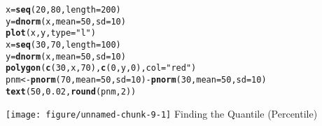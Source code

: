 \documentclass{article}\usepackage[]{graphicx}\usepackage[]{xcolor}
\makeatletter
\def\maxwidth{ %
  \ifdim\Gin@nat@width>\linewidth
    \linewidth
  \else
    \Gin@nat@width
  \fi
}
\newcommand{\hlnum}[1]{\textcolor[rgb]{0.686,0.059,0.569}{#1}}%
\newcommand{\hlsng}[1]{\textcolor[rgb]{0.192,0.494,0.8}{#1}}%
\newcommand{\hlopt}[1]{\textcolor[rgb]{0,0,0}{#1}}%
\newcommand{\hldef}[1]{\textcolor[rgb]{0.345,0.345,0.345}{#1}}%
\newcommand{\hlkwb}[1]{\textcolor[rgb]{0.69,0.353,0.396}{#1}}%
\newcommand{\hlkwc}[1]{\textcolor[rgb]{0.333,0.667,0.333}{#1}}%
\newcommand{\hlkwd}[1]{\textcolor[rgb]{0.737,0.353,0.396}{\textbf{#1}}}%
\newenvironment{kframe}{%
 \def\at@end@of@kframe{}%
 \ifinner\ifhmode%
  \def\at@end@of@kframe{\end{minipage}}%
  \begin{minipage}{\columnwidth}%
 \fi\fi%
 \def\FrameCommand##1{\hskip\@totalleftmargin \hskip-\fboxsep
 \colorbox{shadecolor}{##1}\hskip-\fboxsep
     \hskip-\linewidth \hskip-\@totalleftmargin \hskip\columnwidth}%
 \MakeFramed {\advance\hsize-\width
   \@totalleftmargin\z@ \linewidth\hsize
   \@setminipage}}%
 {\par\unskip\endMakeFramed%
 \at@end@of@kframe}
\newenvironment{knitrout}{}{} %
\makeatother
\begin{document}
\begin{knitrout}
\color{fgcolor}\begin{kframe}
\begin{alltt}
\hldef{x}\hlkwb{=}\hlkwd{seq}\hldef{(}\hlnum{20}\hldef{,}\hlnum{80}\hldef{,}\hlkwc{length}\hldef{=}\hlnum{200}\hldef{)}
\hldef{y}\hlkwb{=}\hlkwd{dnorm}\hldef{(x,}\hlkwc{mean}\hldef{=}\hlnum{50}\hldef{,}\hlkwc{sd}\hldef{=}\hlnum{10}\hldef{)}
\hlkwd{plot}\hldef{(x,y,}\hlkwc{type}\hldef{=}\hlsng{"l"}\hldef{)}
\hldef{x}\hlkwb{=}\hlkwd{seq}\hldef{(}\hlnum{30}\hldef{,}\hlnum{70}\hldef{,}\hlkwc{length}\hldef{=}\hlnum{100}\hldef{)}
\hldef{y}\hlkwb{=}\hlkwd{dnorm}\hldef{(x,}\hlkwc{mean}\hldef{=}\hlnum{50}\hldef{,}\hlkwc{sd}\hldef{=}\hlnum{10}\hldef{)}
\hlkwd{polygon}\hldef{(}\hlkwd{c}\hldef{(}\hlnum{30}\hldef{,x,}\hlnum{70}\hldef{),}\hlkwd{c}\hldef{(}\hlnum{0}\hldef{,y,}\hlnum{0}\hldef{),}\hlkwc{col}\hldef{=}\hlsng{"red"}\hldef{)}
\hldef{pnm} \hlkwb{<-} \hlkwd{pnorm}\hldef{(}\hlnum{70}\hldef{,}\hlkwc{mean}\hldef{=}\hlnum{50}\hldef{,}\hlkwc{sd}\hldef{=}\hlnum{10}\hldef{)}\hlopt{-}\hlkwd{pnorm}\hldef{(}\hlnum{30}\hldef{,}\hlkwc{mean}\hldef{=}\hlnum{50}\hldef{,}\hlkwc{sd}\hldef{=}\hlnum{10}\hldef{)}
\hlkwd{text}\hldef{(}\hlnum{50}\hldef{,} \hlnum{0.02}\hldef{,}\hlkwd{round}\hldef{(pnm,} \hlnum{2}\hldef{))}
\end{alltt}
\end{kframe}
\texttt{[image: figure/unnamed-chunk-9-1]} 
\end{knitrout}
Finding the Quantile (Percentile)
\end{document}
